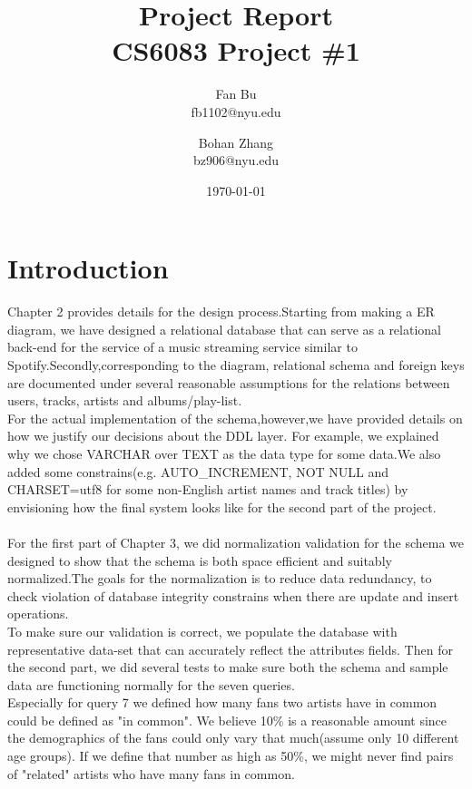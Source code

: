 \documentclass[letterpaper, 12pt]{report}
\title{
	{Project Report}\\
	{\large CS6083 Project \#1}}
\author{Fan Bu \\ fb1102@nyu.edu \and Bohan Zhang \\ bz906@nyu.edu}
\date{\today}
\begin{document}
	\maketitle
	
	\tableofcontents
	
	\chapter{Introduction}
	
	Chapter 2 provides details for the design process.Starting from making a ER diagram, we have designed a relational database that can serve as a relational
	back-end for the service of a music streaming service similar to Spotify.Secondly,corresponding to the diagram, relational schema and foreign keys are documented under several reasonable assumptions for the relations between users, tracks, artists and albums/play-list. \\
	For the actual implementation of the schema,however,we have provided details on how we justify our decisions about the DDL layer. For example, we explained why we chose VARCHAR over TEXT as the data type for some data.We also added some constrains(e.g. AUTO\_INCREMENT, NOT NULL and CHARSET=utf8 for some non-English artist names and track titles) by envisioning how the final system looks like for the second part of the project.\\   
	\\
	For the first part of Chapter 3, we did normalization validation for the schema we designed to show that the schema is both space efficient and suitably normalized.The goals for the normalization is to reduce data redundancy, to check violation of database integrity constrains when there are update and insert operations.\\
	To make sure our validation is correct, we populate the database with representative data-set that can accurately reflect the attributes fields.
    Then for the second part, we did several tests to make sure both the schema and sample data are functioning normally for the seven queries.\\ 
    Especially for query 7 we defined how many fans two artists have in common could be defined as "in common". We believe 10\% is a reasonable amount since the demographics of the fans could only vary that much(assume only 10 different age groups). If we define that number as high as 50\%, we might never find pairs of "related" artists who have many fans in common. 
	
\end{document}
